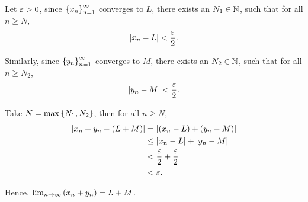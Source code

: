 \documentclass[12pt]{article}
\theoremstyle{definition}
\renewenvironment{proof}[1][\proofname]{\vspace{-10pt}\begin{replacementproof}}{\end{replacementproof}}
\newcommand{\xn}{\set{x_{n}}_{n = 1}^{\infty}}
\newcommand{\nlim}{\lim_{n\rightarrow\infty}}
\begin{document}
    \begin{proof}
       Let $\varepsilon > 0$, since $\xn$ converges to $L$, there exists an $N_{1} \in \mathbb{N}$, such that for all $n \geq N$,
       \begin{equation*}
            \left|x_{n} - L\right| < \frac{\varepsilon}{2}.
       \end{equation*}
       
       Similarly, since $\left\{y_{n}\right\}_{n = 1}^{\infty}$ converges to $M$, there exists an $N_{2} \in \mathbb{N}$, such that for all $n \geq N_{2}$, 
        \begin{equation*}
            \left|y_{n} - M\right| < \frac{\varepsilon}{2}.
       \end{equation*}

       Take $N = \max\left\{N_{1}, N_{2}\right\}$, then for all $n \geq N$, 
       \begin{align*}
            \left|x_{n} + y_{n} - (L + M)\right| &= \left|(x_{n} - L) + (y_{n} - M)\right| \\
                                          &\leq \left|x_{n} - L\right| + \left|y_{n} - M\right| \\
                                          &< \frac{\varepsilon}{2} + \frac{\varepsilon}{2} \\
                                          &< \varepsilon.
       \end{align*}

       Hence, $\nlim \brackets{x_{n} + y_{n}} = L + M$.
    \end{proof}
\end{document}
